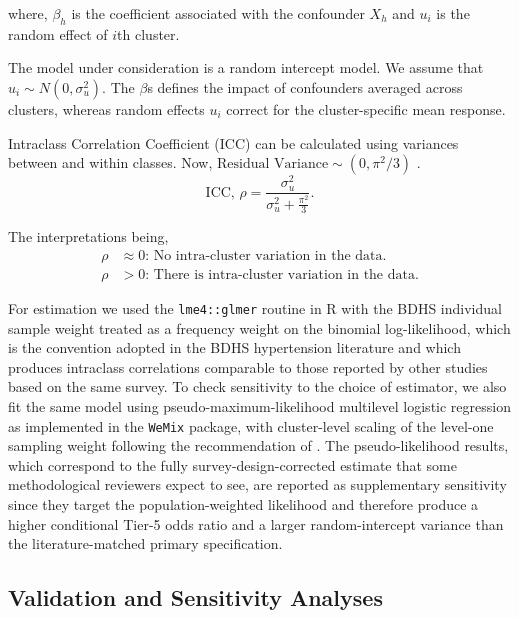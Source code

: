 \documentclass[
  12pt,
  a4paper]{article}
\begin{document}
\noindent
where, \(\beta_h\) is the coefficient associated with the confounder \(X_h\) and \(u_i\) is the random effect of \(i\)th cluster.

The model under consideration is a random intercept model. We assume that \(u_i \sim N(0,\sigma_u^2)\). The \(\beta\)s defines the impact of confounders averaged across clusters, whereas random effects \(u_i\) correct for the cluster-specific mean response.

Intraclass Correlation Coefficient (ICC) can be calculated using variances between and within classes. Now, \(\text{Residual Variance} \sim (0,\pi^2/3)\) \citep{powers2008statistical}.
\[\text{ICC,  }\rho=\frac{\sigma^2_u} {\sigma^2_u+\frac{\pi^2}{3}}. \tag{3.2}\]

The interpretations being,
\[\begin{aligned} \rho &\approx 0 \text{: No intra-cluster variation in the data. } \\
\rho &> 0 \text{: There is intra-cluster variation in the data.} \end{aligned}\]

For estimation we used the \texttt{lme4::glmer} routine in R with the BDHS individual sample weight treated as a frequency weight on the binomial log-likelihood, which is the convention adopted in the BDHS hypertension literature and which produces intraclass correlations comparable to those reported by other studies based on the same survey. To check sensitivity to the choice of estimator, we also fit the same model using pseudo-maximum-likelihood multilevel logistic regression as implemented in the \texttt{WeMix} package, with cluster-level scaling of the level-one sampling weight following the recommendation of \citet{rabe_hesketh_2006}. The pseudo-likelihood results, which correspond to the fully survey-design-corrected estimate that some methodological reviewers expect to see, are reported as supplementary sensitivity since they target the population-weighted likelihood and therefore produce a higher conditional Tier-5 odds ratio and a larger random-intercept variance than the literature-matched primary specification.

\subsection{Validation and Sensitivity Analyses}\label{validation-and-sensitivity-analyses}
\end{document}
